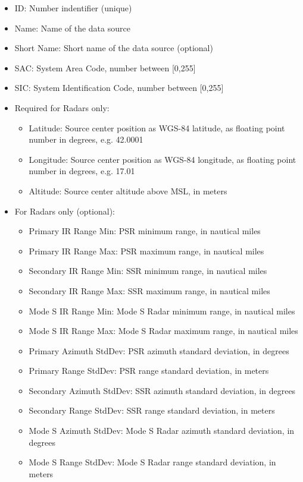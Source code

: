 \begin{itemize}  
\item ID: Number indentifier (unique)
\item Name: Name of the data source
\item Short Name: Short name of the data source (optional)
\item SAC: System Area Code, number between [0,255]
\item SIC: System Identification Code, number between [0,255]
\item Required for Radars only:
\begin{itemize}  
\item Latitude: Source center position as WGS-84 latitude, as floating point number in degrees, e.g. 42.0001
\item Longitude: Source center position as WGS-84 longitude, as floating point number in degrees, e.g. 17.01
\item Altitude: Source center altitude above MSL, in meters
\end{itemize}
\item For Radars only (optional):
\begin{itemize}  
\item Primary IR Range Min: PSR minimum range, in nautical miles
\item Primary IR Range Max: PSR maximum range, in nautical miles
\item Secondary IR Range Min: SSR minimum range, in nautical miles
\item Secondary IR Range Max: SSR maximum range, in nautical miles
\item Mode S IR Range Min: Mode S Radar minimum range, in nautical miles
\item Mode S IR Range Max: Mode S Radar maximum range, in nautical miles
\item Primary Azimuth StdDev: PSR azimuth standard deviation, in degrees
\item Primary Range StdDev: PSR range standard deviation, in meters
\item Secondary Azimuth StdDev: SSR azimuth standard deviation, in degrees
\item Secondary Range StdDev: SSR range standard deviation, in meters
\item Mode S Azimuth StdDev: Mode S Radar azimuth standard deviation, in degrees
\item Mode S Range StdDev: Mode S Radar range standard deviation, in meters
\end{itemize}
\end{itemize}
\ \\

